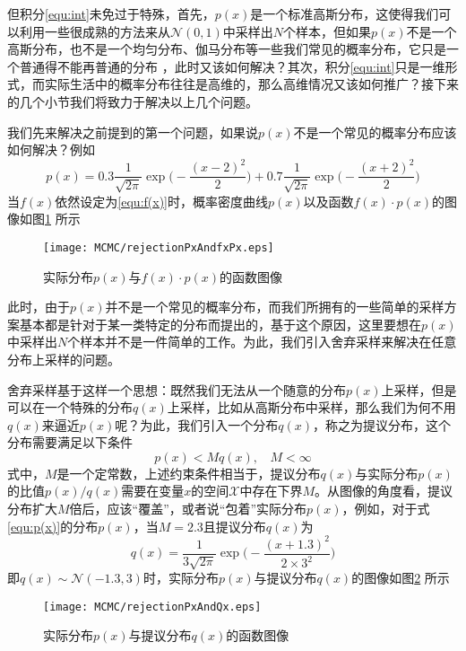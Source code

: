 但积分\eqref{equ:int}未免过于特殊，首先，$p(x)$是一个标准高斯分布，这使得我们可以利用一些很成熟的方法来从$\mathcal{N}(0, 1)$中采样出$N$个样本，但如果$p(x)$不是一个高斯分布，也不是一个均匀分布、伽马分布等一些我们常见的概率分布，它只是一个普通得不能再普通的分布 ，此时又该如何解决？其次，积分\eqref{equ:int}只是一维形式，而实际生活中的概率分布往往是高维的，那么高维情况又该如何推广？接下来的几个小节我们将致力于解决以上几个问题。

我们先来解决之前提到的第一个问题，如果说$p(x)$不是一个常见的概率分布应该如何解决？例如
\begin{equation}\label{equ:p(x)}
p(x) = 0.3 \frac{1}{\sqrt{2\pi}}\exp\Big(-\frac{(x-2)^2}{2}\Big) + 0.7 \frac{1}{\sqrt{2\pi}}\exp\Big(-\frac{(x+2)^2}{2}\Big)
\end{equation}
当$f(x)$依然设定为\eqref{equ:f(x)}时，概率密度曲线$p(x)$以及函数$f(x)\cdot p(x)$的图像如图\ref{img:pxAndfxpx} 所示
\begin{figure}[htbp]\label{img:pxAndfxpx}
\centering
\texttt{[image: MCMC/rejectionPxAndfxPx.eps]}
\caption{实际分布$p(x)$与$f(x)\cdot p(x)$的函数图像}
\end{figure}

此时，由于$p(x)$并不是一个常见的概率分布，而我们所拥有的一些简单的采样方案基本都是针对于某一类特定的分布而提出的，基于这个原因，这里要想在$p(x)$中采样出$N$个样本并不是一件简单的工作。为此，我们引入舍弃采样来解决在任意分布上采样的问题。

舍弃采样基于这样一个思想：既然我们无法从一个随意的分布$p(x)$上采样，但是可以在一个特殊的分布$q(x)$上采样，比如从高斯分布中采样，那么我们为何不用$q(x)$来逼近$p(x)$呢？为此，我们引入一个分布$q(x)$，称之为提议分布，这个分布需要满足以下条件
\begin{equation}
p(x) < Mq(x),~~~~M<\infty
\end{equation}
式中，$M$是一个定常数，上述约束条件相当于，提议分布$q(x)$与实际分布$p(x)$的比值$p(x)/q(x)$需要在变量$x$的空间$\mathcal{X}$中存在下界$M$。从图像的角度看，提议分布扩大$M$倍后，应该“覆盖”，或者说“包着”实际分布$p(x)$，例如，对于式\eqref{equ:p(x)}的分布$p(x)$，当$M=2.3$且提议分布$q(x)$为
\begin{equation}\label{equ:q(x)}
q(x) = \frac{1}{3\sqrt{2\pi}}\exp\Big(-\frac{(x+1.3)^2}{2\times 3^2}\Big)
\end{equation}
即$q(x)\sim \mathcal{N}(-1.3, 3)$时，实际分布$p(x)$与提议分布$q(x)$的图像如图\ref{img:pxAndqx} 所示

\begin{figure}[htbp]\label{img:pxAndqx}
\centering
\texttt{[image: MCMC/rejectionPxAndQx.eps]}
\caption{实际分布$p(x)$与提议分布$q(x)$的函数图像}
\end{figure}

